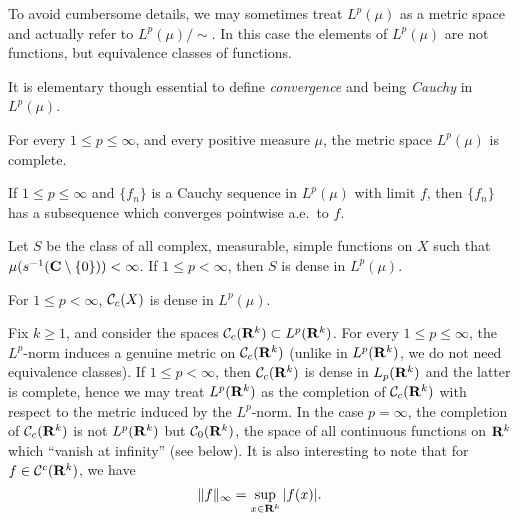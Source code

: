 \begin{remark}
  To avoid cumbersome details, we may sometimes treat $L^p(\mu)$ as a metric space and actually refer to $L^p(\mu)/\!\!\sim$. In this case the elements of $L^p(\mu)$ are not functions, but equivalence classes of functions.
\end{remark}

\begin{remark}
  It is elementary though essential to define \emph{convergence} and being \emph{Cauchy} in $L^p(\mu)$.
\end{remark}

\begin{theorem}
  For every $1 \leq p \leq \infty$, and every positive measure $\mu$, the metric space $L^p(\mu)$ is complete.
\end{theorem}

\begin{theorem}
  If $1 \leq p \leq \infty$ and $\{f_n\}$ is a Cauchy sequence in $L^p(\mu)$ with limit $f$, then $\{f_n\}$ has a subsequence which converges pointwise a.e.\ to $f$.
\end{theorem}

\begin{theorem}
  Let $S$ be the class of all complex, measurable, simple functions on $X$ such that $\mu(s^{-1}(\mathbf{C} \setminus \{0\})) < \infty$. If $1 \leq p < \infty$, then $S$ is dense in $L^p(\mu)$.
\end{theorem}

\begin{theorem}
  For $1 \leq p < \infty$, $\mathcal{C}_c(X)$ is dense in $L^p(\mu)$.
\end{theorem}

\begin{remark}
  Fix $k \geq 1$, and consider the spaces $\mathcal{C}_c(\mathbf{R}^k) \subset L^p(\mathbf{R}^k)$. For every $1 \leq p \leq \infty$, the $L^p$-norm induces a genuine metric on $\mathcal{C}_c(\mathbf{R}^k)$ (unlike in $L^p(\mathbf{R}^k)$, we do not need equivalence classes). If $1 \leq p < \infty$, then $\mathcal{C}_c(\mathbf{R}^k)$ is dense in $L_p(\mathbf{R}^k)$ and the latter is complete, hence we may treat $L^p(\mathbf{R}^k)$ as the completion of $\mathcal{C}_c(\mathbf{R}^k)$ with respect to the metric induced by the $L^p$-norm. In the case $p = \infty$, the  completion of $\mathcal{C}_c(\mathbf{R}^k)$ is not $L^p(\mathbf{R}^k)$ but $\mathcal{C}_0(\mathbf{R}^k)$, the space of all continuous functions on $\mathbf{R}^k$ which ``vanish at infinity'' (see below). It is also interesting to note that for $f \in \mathcal{C}^c(\mathbf{R}^k)$, we have
  \[
  \|f\|_\infty = \sup_{x \in \mathbf{R}^k} |f(x)|.
  \]
\end{remark}

